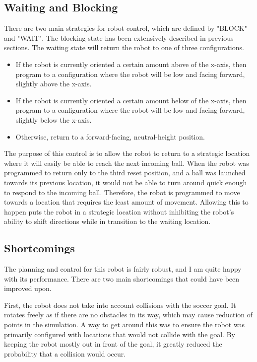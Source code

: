 \documentclass{article}
\begin{document}
\subsection{Waiting and Blocking}
There are two main strategies for robot control, which are defined by "BLOCK" and "WAIT". The blocking state has been extensively described in previous sections. The waiting state will return the robot to one of three configurations.
\begin{itemize}
\item If the robot is currently oriented a certain amount above of the x-axis, then program to a configuration where the robot will be low and facing forward, slightly above the x-axis.
\item If the robot is currently oriented a certain amount below of the x-axis, then program to a configuration where the robot will be low and facing forward, slightly below the x-axis.
\item Otherwise, return to a forward-facing, neutral-height position.
\end{itemize}
The purpose of this control is to allow the robot to return to a strategic location where it will easily be able to reach the next incoming ball. When the robot was programmed to return only to the third reset position, and a ball was launched towards its previous location, it would not be able to turn around quick enough to respond to the incoming ball. Therefore, the robot is programmed to move towards a location that requires the least amount of movement. Allowing this to happen puts the robot in a strategic location without inhibiting the robot's ability to shift directions while in transition to the waiting location.

\subsection{Shortcomings} \label{sec:short_plan}
The planning and control for this robot is fairly robust, and I am quite happy with its performance. There are two main shortcomings that could have been improved upon. \par 

First, the robot does not take into account collisions with the soccer goal. It rotates freely as if there are no obstacles in its way, which may cause reduction of points in the simulation. A way to get around this was to ensure the robot was primarily configured with locations that would not collide with the goal. By keeping the robot mostly out in front of the goal, it greatly reduced the probability that a collision would occur. \par 
\end{document}
